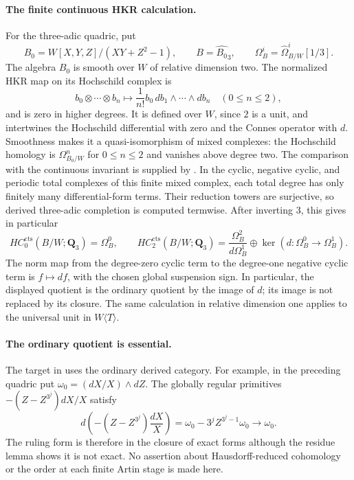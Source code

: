 \documentclass[11pt,a4paper]{article}
\theoremstyle{remark}
\begin{document}
\paragraph{The finite continuous HKR calculation.}
For the three-adic quadric, put
\[
 B_0=W[X,Y,Z]/(XY+Z^2-1),\qquad B=\widehat{B_0}_3,
 \qquad \Omega_B^i=\widehat\Omega^i_{B/W}[1/3].
\]
The algebra $B_0$ is smooth over $W$ of relative dimension two.
The normalized HKR map on its Hochschild complex is
\[
 b_0\otimes\cdots\otimes b_n\longmapsto
 \frac{1}{n!}b_0\,db_1\wedge\cdots\wedge db_n
 \quad(0\le n\le2),
\]
and is zero in higher degrees.  It is defined over $W$, since $2$ is
a unit, and intertwines the Hochschild differential with zero and the
Connes operator with $d$.  Smoothness makes it a quasi-isomorphism of
mixed complexes: the Hochschild homology is $\Omega^n_{B_0/W}$ for
$0\le n\le2$ and vanishes above degree two.
The comparison with the continuous invariant is supplied by
\cite[Proposition~4.2]{AMMN}.  In the cyclic, negative cyclic, and
periodic total complexes of this finite mixed complex, each total
degree has only finitely many differential-form terms.  Their
reduction towers are surjective, so derived three-adic completion is
computed termwise.  After inverting $3$, this gives in particular
\[
 HC^{\mathrm{cts}}_0(B/W;\mathbf Q_3)=\Omega_B^0,
 \qquad
 HC^{\mathrm{cts}}_2(B/W;\mathbf Q_3)
   =\frac{\Omega_B^2}{d\Omega_B^1}
     \oplus\ker(d:\Omega_B^0\to\Omega_B^1).
\]
The norm map from the degree-zero cyclic term to the degree-one
negative cyclic term is $f\mapsto df$, with the chosen global
suspension sign.  In particular, the displayed quotient is the
ordinary quotient by the image of $d$; its image is not replaced by
its closure.  The same calculation in relative dimension one applies
to the universal unit in $W\langle T\rangle$.


\paragraph{The ordinary quotient is essential.}
The target in \cite[Constructions~4.6 and~4.11]{AMMN} uses the
ordinary derived category. For example, in the preceding quadric put
$\omega_0=(dX/X)\wedge dZ$. The globally regular primitives
$-(Z-Z^{3^j})dX/X$ satisfy
\[
 d\!\left(-(Z-Z^{3^j})\frac{dX}{X}\right)
   =\omega_0-3^jZ^{3^j-1}\omega_0\longrightarrow\omega_0.
\]
The ruling form is therefore in the closure of exact forms although
the residue lemma shows it is not exact. No assertion about
Hausdorff-reduced cohomology or the order at each finite Artin stage
is made here.
\end{document}

